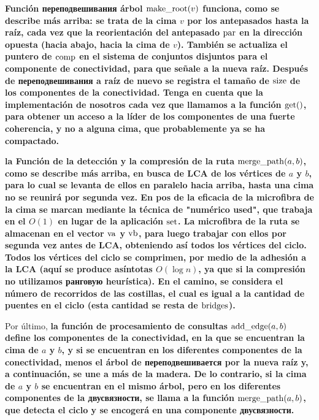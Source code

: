\bf{Función переподвешивания árbol} ${\rm make\_root}(v)$ funciona, como se describe más arriba: se trata de la cima $v$ por los antepasados hasta la raíz, cada vez que la reorientación del antepasado $\rm par$ en la dirección opuesta (hacia abajo, hacia la cima de $v$). También se actualiza el puntero de ${\rm comp}$ en el sistema de conjuntos disjuntos para el componente de conectividad, para que señale a la nueva raíz. Después de переподвешивания a raíz de nuevo se registra el tamaño de ${\rm size}$ de los componentes de la conectividad. Tenga en cuenta que la implementación de nosotros cada vez que llamamos a la función ${\rm get}()$, para obtener un acceso a la líder de los componentes de una fuerte coherencia, y no a alguna cima, que probablemente ya se ha compactado.

\bf{la Función de la detección y la compresión de la ruta} ${\rm merge\_path}(a,b)$, como se describe más arriba, en busca de LCA de los vértices de $a$ y $b$, para lo cual se levanta de ellos en paralelo hacia arriba, hasta una cima no se reunirá por segunda vez. En pos de la eficacia de la microfibra de la cima se marcan mediante la técnica de "numérico used", que trabaja en el $O(1)$ en lugar de la aplicación $\rm set$. La microfibra de la ruta se almacenan en el vector $\rm va$ y $\rm vb$, para luego trabajar con ellos por segunda vez antes de LCA, obteniendo así todos los vértices del ciclo. Todos los vértices del ciclo se comprimen, por medio de la adhesión a la LCA (aquí se produce asíntotas $O(\log n)$, ya que si la compresión no utilizamos ранговую heurística). En el camino, se considera el número de recorridos de las costillas, el cual es igual a la cantidad de puentes en el ciclo (esta cantidad se resta de $\rm bridges$).

Por último, \bf{la función de procesamiento de consultas} ${\rm add\_edge}(a,b)$ define los componentes de la conectividad, en la que se encuentran la cima de $a$ y $b$, y si se encuentran en los diferentes componentes de la conectividad, menos el árbol de переподвешивается por la nueva raíz y, a continuación, se une a más de la madera. De lo contrario, si la cima de $a$ y $b$ se encuentran en el mismo árbol, pero en los diferentes componentes de la двусвязности, se llama a la función ${\rm merge\_path}(a,b)$, que detecta el ciclo y se encogerá en una componente двусвязности.


